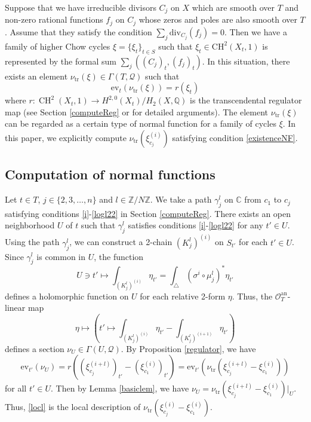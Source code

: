 \documentclass[letterpaper, 11pt]{amsart}
\theoremstyle{my theoremstyle}
\theoremstyle{dfn}
\theoremstyle{remark}
\renewcommand{\1}{\mathbbm{1}}
\newcommand{\C}{\mathbb{C}}
\newcommand{\Q}{\mathbb{Q}}
\newcommand{\Z}{\mathbb{Z}}
\newcommand{\ch}{\operatorname{CH}}
\numberwithin{equation}{section}
\begin{document}
Suppose that we have irreducible divisors $C_j$ on $X$ which are smooth over $T$ and non-zero rational functions $f_j$ on $C_j$ whose zeros and poles are also smooth over $T$.
Assume that they satisfy the condition $\sum_j\mathrm{div}_{C_j}(f_j) = 0$.
Then we have a family of higher Chow cycles $\xi = \{\xi_t\}_{t\in S}$ such that $\xi_t\in \mathrm{CH}^2(X_t,1)$ is represented by the formal sum $\sum_{j}((C_j)_t,(f_j)_t)$.
In this situation, there exists an element $\nu_{\mathrm{tr}}(\xi)\in \Gamma(T,\mathcal{Q})$ such that 
\begin{equation}\label{existenceNF}
\mathrm{ev}_t(\nu_{\mathrm{tr}}(\xi)) = r(\xi_t)
\end{equation}
where $r\colon \ch^2(X_t,1)\to H^{2,0}(X_t)/H_2(X,\Q)$ is the transcendental regulator map (see Section \ref{computeReg} or \cite[Section 2.3]{NS} for detailed arguments).
The element $\nu_{\mathrm{tr}}(\xi)$ can be regarded as a certain type of normal function for a family of cycles $\xi$.
In this paper, we explicitly compute $\nu_{\mathrm{tr}}(\xi_{c_j}^{(i)})$ satisfying condition \eqref{existenceNF}.

\subsection{Computation of normal functions}
Let $t\in T$, $j\in \{2,3,\dots,n\}$ and $l\in \Z/N\Z$. 
We take a path $\gamma_j^l$ on $\C$ from $c_1$ to $c_j$ satisfying conditions \ref{i}-\ref{logl22} in Section \ref{computeReg}.
There exists an open neighborhood $U$ of $t$ such that $\gamma_j^l$ satisfies conditions \ref{i}-\ref{logl22} for any $t'\in U$.
Using the path $\gamma_j^l$, we can construct a 2-chain $(K_j^l)^{(i)}$ on $S_{t'}$ for each $t'\in U$.
Since $\gamma_j^l$ is common in $U$, the function
\begin{equation*}
U\ni t' \mapsto \int_{(K_j^l)^{(i)}}\eta_{t'} = \int_\triangle (\sigma^i\circ\mu_j^l)^*\eta_{t'}
\end{equation*}
defines a holomorphic function on $U$ for each relative 2-form $\eta$.
Thus, the $\mathscr{O}_T^{\mathrm{an}}$-linear map
\begin{equation}\label{locl}
\eta \mapsto \left(t'\mapsto \int_{(K_j^l)^{(i)}}\eta_{t'}-\int_{(K_j^l)^{(i+1)}}\eta_{t'}\right)
\end{equation}
defines a section $\nu_U\in \Gamma(U,\mathcal{Q})$.
By Proposition \ref{regulator}, we have
\begin{equation*}
\mathrm{ev}_{t'}(\nu_U) = r((\xi_{c_j}^{(i+l)})_{t'}-(\xi_{c_1}^{(i)})_{t'}) =\mathrm{ev}_{t'}\left(\nu_{\mathrm{tr}}(\xi_{c_j}^{(i+l)}-\xi_{c_1}^{(i)})\right)
\end{equation*}
for all $t'\in U$.
Then by Lemma \ref{basiclem}, we have $\nu_U = \nu_{\mathrm{tr}}(\xi_{c_j}^{(i+l)}-\xi_{c_1}^{(i)})|_U$.
Thus, \eqref{locl} is the local description of $\nu_{\mathrm{tr}}(\xi_{c_j}^{(i)}-\xi_{c_1}^{(i)})$.
\end{document}
